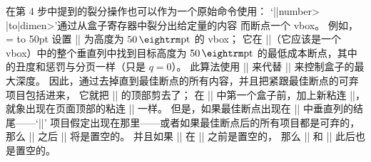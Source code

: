 \ddanger 在第 4 步中提到的裂分操作也可以作为一个原始命令使用：
`|\vsplit|\<number> |to|\<dimen>'通过从盒子寄存器中裂分出给定量的内容%
而断点一个 vbox。%
例如，
\begintt
{}= to 50pt
\endtt
设置 || 为高度为 $50\pt$ 的 vbox；
它在 ||（它应该是一个 vbox）中的整个垂直列中找到目标高度为 $50\pt$
的最低成本断点，其中的丑度和惩罚与分页一样（只是 $q=0$）。
此算法使用 |\splitmaxdepth| 来代替 |\maxdepth| 来控制盒子的最大深度。%
因此，通过去掉直到最佳断点的所有内容，并且把紧跟最佳断点的可弃项目包括进来，
它就把 || 的顶部剪去了；
在 || 中第一个盒子前，加上新粘连 |\splittopskip|，
就象出现在页面顶部的粘连 |\topskip| 一样。%
但是，如果最佳断点出现在 || 中垂直列的结尾——`||'%
项目假定出现在那里——或者如果最佳断点后的所有项目都是可弃的，
那么 |\vsplit| 之后 || 将是置空的。%
并且如果 || 在 |\vsplit| 之前是置空的，
那么 || 和 || 此后也是置空的。

